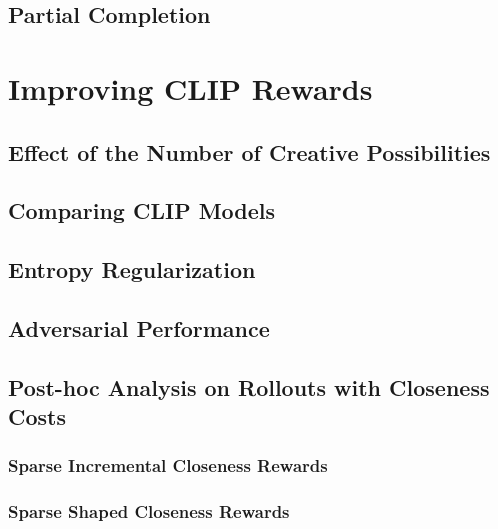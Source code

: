 \subsection{Partial Completion}
\label{sec:partial-completion}



\section{Improving CLIP Rewards}
\label{sec:improving-rewards}

\subsection{Effect of the Number of Creative Possibilities}
\label{sec:clip-categories}


\subsection{Comparing CLIP Models}
\label{sec:clip-comparison}


\subsection{Entropy Regularization}
\label{sec:entropy-regularization}


\subsection{Adversarial Performance}
\label{sec:adversarial-performance}


\subsection{Post-hoc Analysis on Rollouts with Closeness Costs}
\label{sec:closeness-rollouts}


\subsubsection{Sparse Incremental Closeness Rewards}
\label{sec:sparse-incremental-closeness}


\subsubsection{Sparse Shaped Closeness Rewards}
\label{sec:sparse-shaped-closeness}


